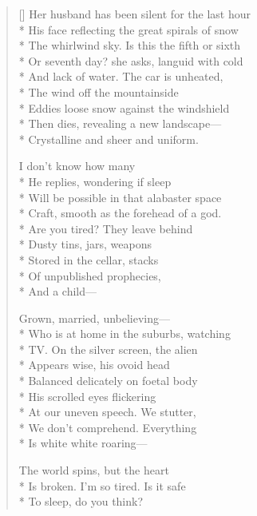 \label{ch:husband_and_wife_freeze}
\settowidth{\versewidth}{The whirlwind sky. Is this the fifth or sixth}
\begin{verse}[\versewidth]
Her husband has been silent for the last hour\\*
His face reflecting the great spirals of snow\\*
The whirlwind sky. Is this the fifth or sixth\\*
Or seventh day? she asks, languid with cold\\*
And lack of water.   The car is unheated,\\*
The wind off the mountainside\\*
Eddies loose snow against the windshield\\*
Then dies, revealing a new landscape---\\*
Crystalline and sheer and uniform.

I don't know how many\\*
He replies, wondering if sleep\\*
Will be possible in that alabaster space\\*
Craft, smooth as the forehead of a god.\\*
Are you tired?      They leave behind\\*
Dusty tins, jars, weapons\\*
Stored in the cellar, stacks\\*
Of unpublished prophecies,\\*
And a child---

Grown, married, unbelieving---\\*
Who is at home in the suburbs, watching\\*
TV.   On the silver screen, the alien\\*
Appears wise, his ovoid head\\*
Balanced delicately on foetal body\\*
His scrolled eyes flickering\\*
At our uneven speech.     We stutter,\\*
We don't comprehend.     Everything\\*
Is white        white      roaring---

The world spins, but the heart\\*
Is broken.    I'm so tired.     Is it safe\\*
To sleep, do you think?
\end{verse}
